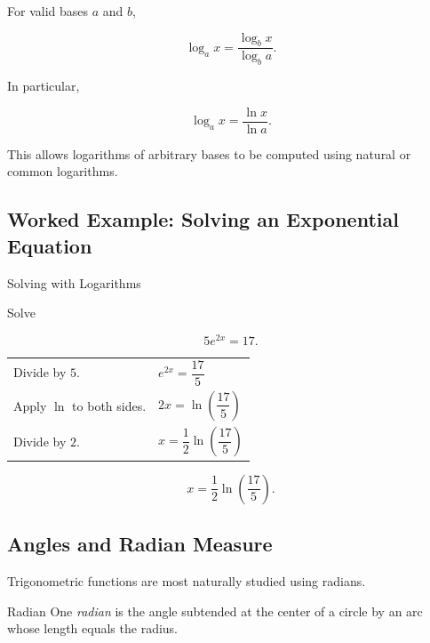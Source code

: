 For valid bases \(a\) and \(b\),

\[ \log_a x=\frac{\log_b x}{\log_b a}. \]

In particular,

\[ \log_a x=\frac{\ln x}{\ln a}. \]

This allows logarithms of arbitrary bases to be computed using natural or
common logarithms.

\subsection{Worked Example: Solving an Exponential Equation}
\label{subsec:worked-exponential-equation}

\begin{workedexamplebox}{Solving with Logarithms}

Solve

\[ 5e^{2x}=17. \]

\begin{tabularx}{\textwidth}{@{}>{\raggedright\arraybackslash}p{}X@{}}
Divide by \(5\). &
\(e^{2x}=\dfrac{17}{5}\)\\
Apply \(\ln\) to both sides. &
\(2x=\ln\left(\dfrac{17}{5}\right)\)\\
Divide by \(2\). &
\(x=\dfrac12\ln\left(\dfrac{17}{5}\right)\)
\end{tabularx}

\begin{answerbox}
\[ \boxed{x=\frac12\ln\left(\frac{17}{5}\right).} \]
\end{answerbox}
\end{workedexamplebox}

\subsection{Angles and Radian Measure}
\label{subsec:radian-measure}

Trigonometric functions are most naturally studied using radians.

\begin{definitionbox}{Radian}
One \emph{radian} is the angle subtended at the center of a circle by an arc
whose length equals the radius.
\end{definitionbox}


